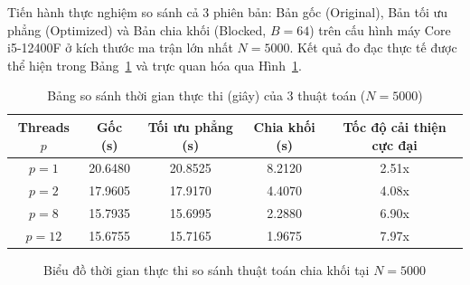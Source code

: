 Tiến hành thực nghiệm so sánh cả 3 phiên bản: Bản gốc (Original), Bản tối ưu phẳng (Optimized) và Bản chia khối (Blocked, $B=64$) trên cấu hình máy Core i5-12400F ở kích thước ma trận lớn nhất $N=5000$. Kết quả đo đạc thực tế được thể hiện trong Bảng~\ref{tab:gauss_blocked_comparison} và trực quan hóa qua Hình~\ref{fig:gauss_blocked_comparison_chart}.

\begin{table}[H]
    \centering
    \caption{Bảng so sánh thời gian thực thi (giây) của 3 thuật toán ($N=5000$)}
    \label{tab:gauss_blocked_comparison}
    \vspace{0.2cm}
    \small
    \begin{tabular}{c|ccc|c}
        \toprule
        \textbf{Threads $p$} & \textbf{Gốc (s)} & \textbf{Tối ưu phẳng (s)} & \textbf{Chia khối (s)} & \textbf{Tốc độ cải thiện cực đại} \\
        \midrule
        $p=1$                & 20.6480          & 20.8525                   & 8.2120                 & 2.51x                             \\
        $p=2$                & 17.9605          & 17.9170                   & 4.4070                 & 4.08x                             \\
        $p=8$                & 15.7935          & 15.6995                   & 2.2880                 & 6.90x                             \\
        $p=12$               & 15.6755          & 15.7165                   & 1.9675                 & 7.97x                             \\
        \bottomrule
    \end{tabular}
\end{table}

\begin{figure}[H]
    \centering
    \caption{Biểu đồ thời gian thực thi so sánh thuật toán chia khối tại $N=5000$}
    \label{fig:gauss_blocked_comparison_chart}
\end{figure}


